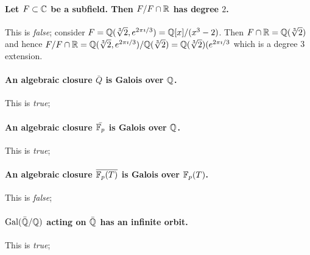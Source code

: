 \paragraph*{Let $F \subset \mathbb{C}$ be a subfield. Then $F / F \cap \mathbb{R}$ has degree $2$.} This is \emph{false}; consider $F = \mathbb{Q}(\sqrt[3]{2}, e^{2\pi\imath / 3}) = \mathbb{Q}[x] / (x^3 - 2)$. Then $F \cap \mathbb{R} = \mathbb{Q}(\sqrt[3]{2})$ and hence $F / F \cap \mathbb{R} = \mathbb{Q}(\sqrt[3]{2}, e^{2\pi\imath / 3}) / \mathbb{Q}(\sqrt[3]{2}) = \mathbb{Q}(\sqrt[3]{2})(e^{2\pi\imath / 3}$ which is a degree $3$ extension.

\paragraph*{An algebraic closure $\bar{Q}$ is Galois over $\mathbb{Q}$.} This is \emph{true}; %

\paragraph*{An algebraic closure $\bar{\mathbb{F}_p}$ is Galois over $\mathbb{Q}$.} This is \emph{true}; %

\paragraph*{An algebraic closure $\overline{\mathbb{F}_p(T)}$ is Galois over $\mathbb{F}_p(T)$.} This is \emph{false}; %

\paragraph*{$\mathrm{Gal}(\bar{\mathbb{Q}} / \mathbb{Q})$ acting on $\bar{\mathbb{Q}}$ has an infinite orbit.} This is \emph{true}; %

